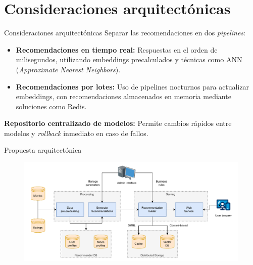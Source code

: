 \documentclass{beamer}
\begin{document}
\section{Consideraciones arquitectónicas}
\begin{frame}{Consideraciones arquitectónicas}
Separar las recomendaciones en dos \textit{pipelines}:
\pause
    \begin{itemize}
        \item \textbf{Recomendaciones en tiempo real:}
        Respuestas en el orden de milisegundos, utilizando embeddings precalculados y técnicas como ANN (\textit{Approximate Nearest Neighbors}).
        \pause
        \item \textbf{Recomendaciones por lotes:} 
        Uso de pipelines nocturnos para actualizar embeddings, con recomendaciones almacenados en memoria mediante soluciones como Redis.
    \end{itemize}
\pause
\textbf{Repositorio centralizado de modelos:} 
        Permite cambios rápidos entre modelos y \textit{rollback} inmediato en caso de fallos.
\end{frame}

\begin{frame}{Propuesta arquitectónica}
    \begin{figure}
    \centering
        \includegraphics[width=\textwidth]{images/tfm-arch.drawio.pdf}
    \end{figure}
\end{frame}
\end{document}
